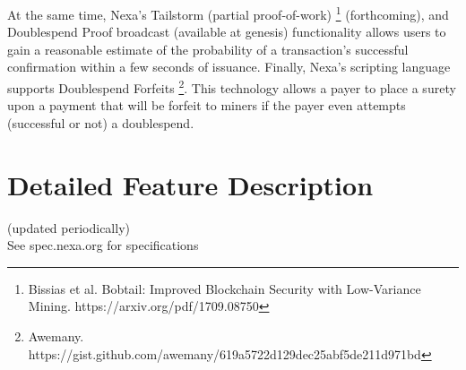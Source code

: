 \documentclass[a4paper, 11pt]{article}
\begin{document}
At the same time, Nexa’s Tailstorm (partial proof-of-work) \footnote{Bissias et al. Bobtail: Improved Blockchain Security with Low-Variance Mining. https://arxiv.org/pdf/1709.08750} (forthcoming), and Doublespend Proof broadcast (available at genesis) functionality allows users to gain a reasonable estimate of the probability of a transaction’s successful confirmation within a few seconds of issuance.  Finally, Nexa’s scripting language supports Doublespend Forfeits \footnote{Awemany. https://gist.github.com/awemany/619a5722d129dec25abf5de211d971bd}.  This technology allows a payer to place a surety upon a payment that will be forfeit to miners if the payer even attempts (successful or not) a doublespend.

\section{Detailed Feature Description}
(updated periodically)\\
See spec.nexa.org for specifications
\end{document}
